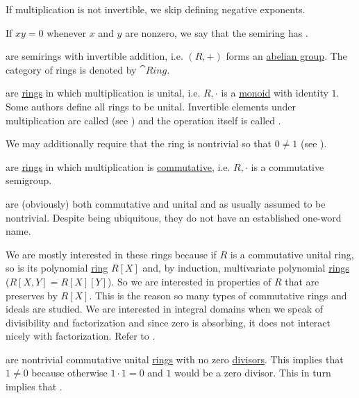 \begin{definition}
\begin{thmenum}[resume=def:semiring]
    If multiplication is not invertible, we skip defining negative exponents.

     If \( xy = 0 \) whenever \( x \) and \( y \) are nonzero, we say that the semiring has .

      are semirings with invertible addition, i.e. \( (R, +) \) forms an \hyperref[def:abelian_group]{abelian group}. The category of rings is denoted by \( \cat{Ring} \).

      are \hyperref[def:semiring/ring]{rings} in which multiplication is unital, i.e. \( R, \cdot \) is a \hyperref[def:unital_magma/associative]{monoid} with identity \( 1 \). Some authors define all rings to be unital. Invertible elements under multiplication are called  (see ) and the operation itself is called .

    We may additionally require that the ring is nontrivial so that \( 0 \neq 1 \) (see ).

      are \hyperref[def:semiring/ring]{rings} in which multiplication is \hyperref[def:magma/commutative]{commutative}, i.e. \( R, \cdot \) is a commutative semigroup.

      are (obviously) both commutative and unital and as usually assumed to be nontrivial. Despite being ubiquitous, they do not have an established one-word name.

    We are mostly interested in these rings because if \( R \) is a commutative unital ring, so is its polynomial \hyperref[def:algebra_of_polynomials]{ring} \( R[X] \) and, by induction\IND, multivariate polynomial \hyperref[def:multivariate_polynomial]{rings} (\( R[X, Y] = R[X][Y] \)). So we are interested in properties of \( R \) that are preserves by \( R[X] \). This is the reason so many types of commutative rings and ideals are studied. We are interested in integral domains when we speak of divisibility and factorization and since zero is absorbing, it does not interact nicely with factorization. Refer to .

      are nontrivial commutative unital \hyperref[def:semiring/commutative_unital_ring]{rings} with no zero \hyperref[def:commutative_ring_division]{divisors}. This implies that \( 1 \neq 0 \) because otherwise \( 1 \cdot 1 = 0 \) and \( 1 \) would be a zero divisor. This in turn implies that .


\end{thmenum}
\end{definition}
